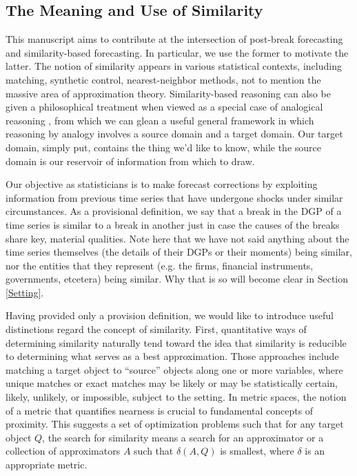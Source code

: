 \documentclass{uiucthesis2021}
\theoremstyle{definition}
\begin{document}
    \subsection{The Meaning and Use of Similarity}
  This manuscript aims to contribute at the intersection of post-break forecasting and similarity-based forecasting.  In particular, we use the former to motivate the latter.  The notion of similarity appears in various statistical contexts, including matching, synthetic control, nearest-neighbor methods, not to mention the massive area of approximation theory.  Similarity-based reasoning can also be given a philosophical treatment when viewed as a special case of analogical reasoning \parencite[][]{bartha2013analogy}, from which we can glean a useful general framework in which reasoning by analogy involves a source domain and a target domain.  Our target domain, simply put, contains the thing we'd like to know, while the source domain is our reservoir of information from which to draw.  
  
  Our objective as statisticians is to make forecast corrections by exploiting information from previous time series that have undergone shocks under similar circumstances.  As a provisional definition, we say that a break in the DGP of a time series is similar to a break in another just in case the causes of the breaks share key, material qualities.  Note here that we have not said anything about the time series themselves (the details of their DGPs or their moments) being similar, nor the entities that they represent (e.g. the firms, financial instruments, governments, etcetera) being similar.  Why that is so will become clear in Section \ref{Setting}.
  
  Having provided only a provision definition, we would like to introduce useful distinctions regard the concept of similarity.  First, quantitative ways of determining similarity naturally tend toward the idea that similarity is reducible to determining what serves as a best approximation.  Those approaches include matching a target object to ``source'' objects along one or more variables, where unique matches or exact matches may be likely or may be statistically certain, likely, unlikely, or impossible, subject to the setting.  In metric spaces, the notion of a metric that quantifies nearness is crucial to fundamental concepts of proximity.  This suggests a set of optimization problems such that for any target object $Q$, the search for similarity means a search for an approximator or a collection of approximators $A$ such that $\delta(A,Q)$ is smallest, where $\delta$ is an appropriate metric.
  
\end{document}
